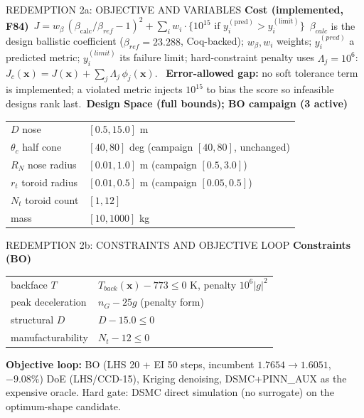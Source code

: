 \documentclass[aspectratio=169,11pt]{beamer}
\begin{document}
\begin{frame}{REDEMPTION 2a: OBJECTIVE AND VARIABLES}
  \small
  \textbf{Cost (implemented, F84)}\
  $J = w_\beta\,(\beta_{\mathrm{calc}}/\beta_{ref}-1)^2 +
  \sum_i w_i\cdot\{10^{15}\text{ if }y_i^{(\mathrm{pred})} > y_i^{(\mathrm{limit})}\}$\
  $\beta_{calc}$ is the design ballistic coefficient ($\beta_{ref}=23.288$, Coq-backed);
  $w_\beta,w_i$ weights; $y_i^{(pred)}$ a predicted metric;
  $y_i^{(limit)}$ its failure limit; hard-constraint penalty uses $\Lambda_j=10^6$:\
  $J_c(\mathbf{x}) = J(\mathbf{x}) + \sum_j \Lambda_j\,\phi_j(\mathbf{x})$.\
  \vspace{0.1cm}
  \textbf{Error-allowed gap:} no soft tolerance term is implemented; a violated
  metric injects $10^{15}$ to bias the score so infeasible designs rank last.\
  \textbf{Design Space (full bounds); BO campaign (3 active)}\
  \begin{tabular}{@{}ll@{}}
  \hline
  $D$ nose & $[0.5,15.0]$ m\\
  $\theta_c$ half cone & $[40,80]$ deg (campaign $[40,80]$, unchanged)\\
  $R_N$ nose radius & $[0.01,1.0]$ m (campaign $[0.5,3.0]$)\\
  $r_t$ toroid radius & $[0.01,0.5]$ m (campaign $[0.05,0.5]$)\\
  $N_t$ toroid count & $[1,12]$\\
  mass & $[10,1000]$ kg\\
  \hline
  \end{tabular}
\end{frame}

\begin{frame}{REDEMPTION 2b: CONSTRAINTS AND OBJECTIVE LOOP}
  \small
  \textbf{Constraints (BO)}\
  \begin{tabular}{@{}p{3.3cm}p{4.8cm}@{}}
  backface $T$ & $T_{back}(\mathbf{x})-773\le 0$ K, penalty $10^6 |g|^2$\\
  peak deceleration & $n_G-25g$ (penalty form)\\
  structural $D$ & $D-15.0\le 0$\\
  manufacturability & $N_t-12\le 0$\\
  \end{tabular}
  \vspace{0.2cm}
  \textbf{Objective loop:} BO (LHS 20 + EI 50 steps, incumbent $1.7654\to1.6051$,
  $-9.08\%$) \; DoE (LHS/CCD-15), Kriging denoising, DSMC+PINN\_AUX as the
  expensive oracle. Hard gate: DSMC direct simulation (no surrogate) on the
  optimum-shape candidate.
\end{frame}
\end{document}
